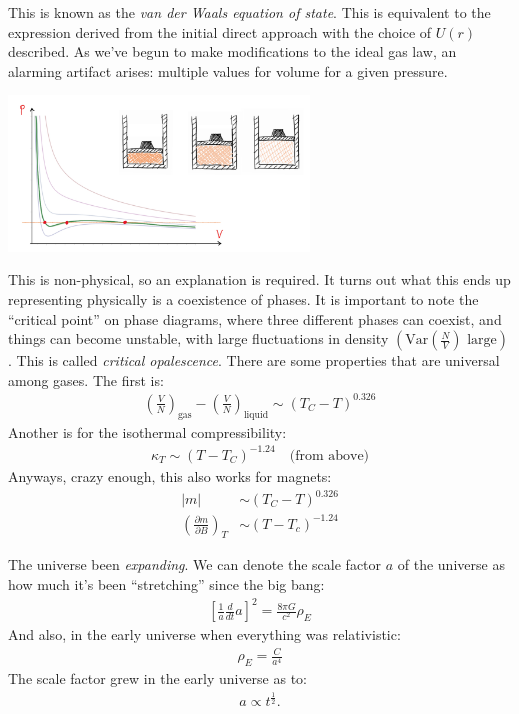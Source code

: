 \documentclass{article}
\begin{document}
This is known as the \textit{van der Waals equation of state}. This is equivalent to the expression derived from the initial direct approach with the choice of $U(r)$ described.
\vfill\pagebreak
{}
As we've begun to make modifications to the ideal gas law, an alarming artifact arises: multiple values for volume for a given pressure.
\begin{center}
  \includegraphics[width=0.6\textwidth]{images/triple_value.png}
\end{center}
This is non-physical, so an explanation is required. It turns out what this ends up representing physically is a coexistence of phases. It is important to note the ``critical point'' on phase diagrams, where three different phases can coexist, and things can become unstable, with large fluctuations in density $\left(\text{Var} \left(\frac{N}{V}\right)\text{ large}\right)$ . This is called \textit{critical opalescence}.
\gap
{} There are some properties that are universal among gases. The first is:
\begin{align*}
  \left(\frac{V}{N}\right)_\text{gas} - \left(\frac{V}{N}\right)_\text{liquid} \sim (T_C - T)^{0.326}
\end{align*}
Another is for the isothermal compressibility:
\begin{align*}
  \kappa_T \sim (T - T_C)^{-1.24} \quad \text{(from above)}
\end{align*}
Anyways, crazy enough, this also works for magnets:
\begin{align*}
  |m| &\sim (T_C - T)^{0.326}\\
  \left(\frac{\partial m}{\partial B}\right)_T &\sim (T - T_c)^{-1.24}
\end{align*}


The universe been \textit{expanding}. We can denote the scale factor $a$ of the universe as how much it's been ``stretching'' since the big bang:
\begin{align*}
  \left[\frac{1}{a} \frac{d}{dt}a\right]^2 = \frac{8\pi G}{c^2}\rho_E
\end{align*}
And also, in the early universe when everything was relativistic:
\begin{align*}
  \rho_E = \frac{C}{a^4}
\end{align*}
The scale factor grew in the early universe as to:
\begin{align*}
  a \propto t^\frac{1}{2}.
\end{align*}
\end{document}
